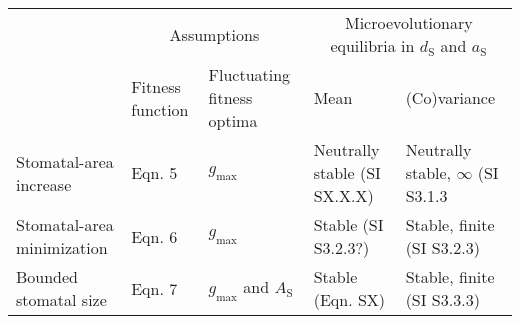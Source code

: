 \documentclass[varwidth=6.5in]{standalone}
\begin{document}
\begin{table}[!t]
\fontsize{12.0pt}{14.4pt}\selectfont
\begin{tabular*}{\linewidth}{@{\extracolsep{\fill}}l|llll}
\toprule
 & \multicolumn{2}{c}{Assumptions} & \multicolumn{2}{c}{Microevolutionary equilibria in $d_\mathrm{S}$ and $a_\mathrm{S}$} \\ 
\cmidrule(lr){2-3} \cmidrule(lr){4-5}
 & Fitness function & Fluctuating fitness optima & Mean & (Co)variance \\ 
\midrule\addlinespace[2.5pt]
Stomatal-area increase & Eqn. 5 & $g_\mathrm{max}$ & Neutrally stable (SI SX.X.X) & Neutrally stable, $\infty$ (SI S3.1.3 \\ 
Stomatal-area minimization & Eqn. 6 & $g_\mathrm{max}$ & Stable (SI S3.2.3?) & Stable, finite (SI S3.2.3) \\ 
Bounded stomatal size & Eqn. 7 & $g_\mathrm{max}$ and $A_\mathrm{S}$ & Stable (Eqn. SX) & Stable, finite (SI S3.3.3) \\ 
\bottomrule
\end{tabular*}
\end{table}
\end{document}

